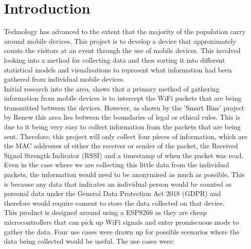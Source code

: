 \documentclass{report}
\begin{document}
\chapter{Introduction}
Technology has advanced to the extent that the majority of the population carry around mobile devices. This project is to develop a device that approximately counts the visitors at an event through the use of mobile devices. This involved looking into a method for collecting data and then sorting it into different statistical models and visualisations to represent what information had been gathered from individual mobile devices. \\ \newline
Initial research into the area, shows that a primary method of gathering information from mobile devices is to intercept the WiFi packets that are being transmitted between the devices. However, as shown by the 'Smart Bins' project by Renew\cite{Smart_bins} this area lies between the boundaries of legal or ethical rules. This is due to it being very easy to collect information from the packets that are being sent. Therefore, this project will only collect four pieces of information, which are the MAC addresses of either the receiver or sender of the packet, the Received Signal Strength Indicator (RSSI) and a timestamp of when the packet was read. Even in the case where we are collecting this little data from the individual packets, the information would need to be anonymised as much as possible. This is because any data that indicates an individual person would be counted as personal data under the General Data Protection Act 2018 (GDPR)\cite{GDPR} and therefore would require consent to store the data collected on that device.  \\ \newline
This product is designed around using a ESP8266 as they are cheap microcontrollers that can pick up WiFi signals and enter promiscuous mode to gather the data\cite{Promiscuous_mode}. Four use cases were drawn up for possible scenarios where the data being collected would be useful. The use cases were:
\end{document}
